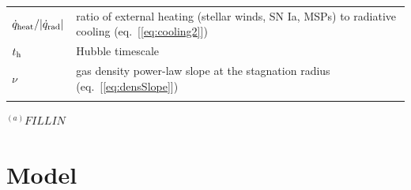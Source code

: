 \documentclass[usenatbib,fleqn]{mn2e}
\begin{document}
\begin{table}
\begin{threeparttable}
\begin{minipage}{18cm}
\begin{tabular}{ll}
$\dot{q}_{\rm heat}/|\dot{q}_{\rm rad}|$ & ratio of external heating (stellar winds, SN Ia, MSPs) to radiative cooling (eq.~[\ref{eq:cooling2}]) \\
$t_{\rm h}$ & Hubble timescale \\
$\nu$ & gas density power-law slope at the stagnation radius (eq.~[\ref{eq:densSlope}]) \\
\hline
\label{table:definitions}  
\end{tabular}
\begin{tablenotes}
\item{$^{(a)}FILL IN$}
\end{tablenotes}
\end{minipage}
\end{threeparttable}

\end{table}


\section{Model}
\label{sec:model}
\end{document}
